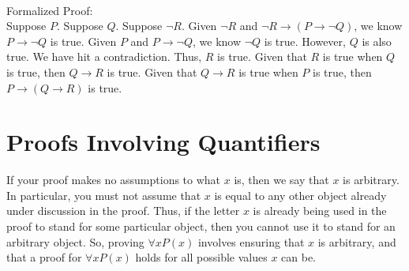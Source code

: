 \documentclass{article}
\begin{document}
\\
Formalized Proof:\\
Suppose $P$. Suppose $Q$. Suppose $\neg R$. Given $\neg R$ and $\neg R \rightarrow (P \rightarrow \neg Q)$, we know $P \rightarrow \neg Q$ is true. Given $P$ and $P \rightarrow \neg Q$, we know $\neg Q$ is true. However, $Q$ is also true. We have hit a contradiction. Thus, $R$ is true. Given that $R$ is true when $Q$ is true, then $Q \rightarrow R$ is true. Given that $Q \rightarrow R$ is true when $P$ is true, then $P \rightarrow (Q \rightarrow R)$ is true. 

\section{Proofs Involving Quantifiers}
If your proof makes no assumptions to what $x$ is, then we say that $x$ is \gls{arbitrary}. In particular, you must not assume that $x$ is equal to any other object already under discussion in the proof. Thus, if the letter $x$ is already being used in the proof to stand for some particular object, then you cannot use it to stand for an arbitrary object. So, proving $\forall xP(x)$ involves ensuring that $x$ is arbitrary, and that a proof for $\forall xP(x)$ holds for all possible values $x$ can be.\\
\end{document}
